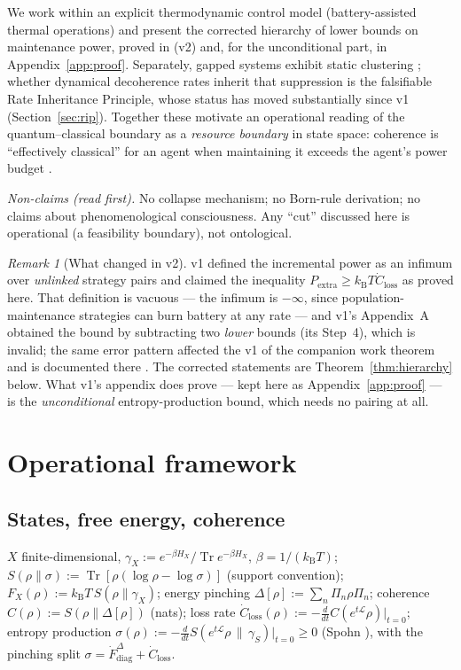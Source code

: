 \documentclass[11pt,a4paper]{article}
\theoremstyle{plain}
\theoremstyle{definition}
\theoremstyle{remark}
\newtheorem{remark}[theorem]{Remark}
\newcommand{\Tr}{\operatorname{Tr}}
\newcommand{\kB}{k_{\mathrm{B}}}
\newcommand{\Pextra}{P_{\mathrm{extra}}}
\newcommand{\Closs}{\dot{C}_{\mathrm{loss}}}
\begin{document}
We work within an explicit thermodynamic control model (battery-assisted
thermal operations) and present the corrected hierarchy of lower bounds on
maintenance power, proved in \cite{MaintWork} (v2) and, for the unconditional
part, in Appendix~\ref{app:proof}. Separately, gapped systems exhibit static
clustering \cite{HastingsKoma,NachtergaeleSims,LiebRobinson}; whether
dynamical decoherence rates inherit that suppression is the falsifiable Rate
Inheritance Principle, whose status has moved substantially since v1
(Section~\ref{sec:rip}). Together these motivate an operational reading of
the quantum--classical boundary as a \emph{resource boundary} in state
space: coherence is ``effectively classical'' for an agent when maintaining
it exceeds the agent's power budget \cite{HCut}.

\emph{Non-claims (read first).} No collapse mechanism; no Born-rule
derivation; no claims about phenomenological consciousness. Any ``cut''
discussed here is operational (a feasibility boundary), not ontological.

\begin{remark}[What changed in v2]\label{rem:v2}
v1 defined the incremental power as an infimum over \emph{unlinked} strategy
pairs and claimed the inequality $\Pextra \ge \kB T\Closs$ as proved here.
That definition is vacuous --- the infimum is $-\infty$, since
population-maintenance strategies can burn battery at any rate --- and v1's
Appendix~A obtained the bound by subtracting two \emph{lower} bounds (its
Step~4), which is invalid; the same error pattern affected the v1 of the
companion work theorem and is documented there \cite{MaintWork}. The
corrected statements are Theorem~\ref{thm:hierarchy} below. What v1's
appendix does prove --- kept here as Appendix~\ref{app:proof} --- is the
\emph{unconditional} entropy-production bound, which needs no pairing at
all.
\end{remark}

\section{Operational framework}

\subsection{States, free energy, coherence}

$X$ finite-dimensional, $\gamma_X := e^{-\beta H_X}/\Tr e^{-\beta H_X}$,
$\beta = 1/(\kB T)$; $S(\rho\|\sigma) := \Tr[\rho(\log\rho - \log\sigma)]$
(support convention); $F_X(\rho) := \kB T\, S(\rho\|\gamma_X)$; energy
pinching $\Delta[\rho] := \sum_n\Pi_n\rho\Pi_n$; coherence $C(\rho) :=
S(\rho\|\Delta[\rho])$ (nats); loss rate $\Closs(\rho) :=
-\frac{d}{dt}C(e^{t\mathcal{L}}\rho)|_{t=0}$; entropy production
$\sigma(\rho) := -\frac{d}{dt}S(e^{t\mathcal{L}}\rho\,\|\,\gamma_S)|_{t=0}
\ge 0$ (Spohn \cite{Spohn78}), with the pinching split $\sigma =
\dot{F}^\Delta_{\mathrm{diag}} + \Closs$.
\end{document}

